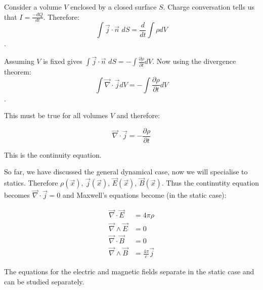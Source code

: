 Consider a volume $V$ enclosed by a closed surface $S$. Charge conversation tells us that $I = \frac{-dQ}{dt}$. Therefore: $$\int \vec{j} \cdot \vec{n} \, \, dS = \frac{d}{dt} \int \rho dV$$.

Assuming $V$ is fixed gives $\int \vec{j} \cdot \vec{n} \, \, dS = - \int \frac{\partial \rho}{\partial t} dV$. Now using the divergence theorem: $$\int \vec{\nabla} \cdot \vec{j} dV = - \int \frac{\partial \rho}{\partial t} dV$$.

This must be true for all volumes $V$ and therefore:

\begin{equation}
\vec{\nabla} \cdot \vec{j} = - \frac{\partial \rho}{\partial t}
\end{equation}

This is the continuity equation.

\vspace{\baselineskip}

So far, we have discussed the general dynamical case, now we will specialise to statics. Therefore $\rho(\vec{x})$, $\vec{j} (\vec{x})$, $\vec{E} (\vec{x})$, $\vec{B} (\vec{x})$. Thus the continutity equation becomes $\vec{\nabla} \cdot \vec{j} = 0$ and Maxwell's equations become (in the static case):

\begin{align*}
\vec{\nabla} \cdot \vec{E} &= 4 \pi \rho \\
\vec{\nabla} \wedge \vec{E} &= 0 \\
\vec{\nabla} \cdot \vec{B} &= 0 \\
\vec{\nabla} \wedge \vec{B} &= \frac{4 \pi}{c} \vec{j}
\end{align*}

The equations for the electric and magnetic fields separate in the static case and can be studied separately.